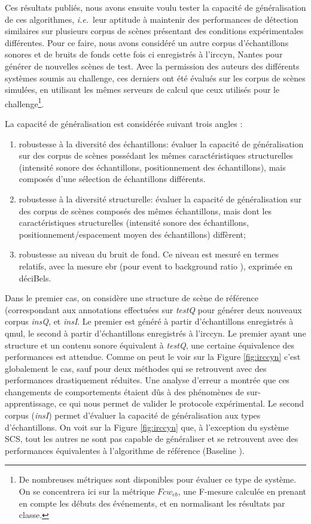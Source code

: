   Ces résultats publiés\cite{stowellhal-01253912}, nous avons ensuite voulu tester la capacité de généralisation de ces algorithmes, \textit{i.e.}~leur aptitude à maintenir des performances de détection similaires sur plusieurs corpus de scènes présentant des conditions expérimentales différentes. Pour ce faire, nous avons considéré un autre corpus d'échantillons sonores et de bruits de fonds  cette fois ci enregistrés à l'irccyn, Nantes pour générer de nouvelles scènes de test. Avec la permission des auteurs des différents systèmes soumis au challenge, ces derniers ont été évalués sur les corpus de scènes simulées, en utilisant les mêmes serveurs de calcul que ceux utilisés pour le challenge\footnote{De nombreuses métriques sont disponibles pour évaluer ce type de système. On se concentrera ici sur la métrique $Fcw_{eb}$, une F-mesure calculée en prenant en compte les débuts des événements, et en normalisant les résultats par classe.}.

  La capacité de généralisation est considérée suivant trois angles :
  \begin{enumerate}
    \item robustesse à la diversité des échantillons: évaluer la capacité de généralisation sur des corpus de scènes possédant les mêmes caractéristiques structurelles (intensité sonore des échantillons, positionnement des échantillons), mais composés d'une sélection de échantillons différents.
    \item robustesse à la diversité structurelle: évaluer la capacité de généralisation sur des corpus de scènes composés des mêmes échantillons, mais dont les caractéristiques structurelles (intensité sonore des échantillons, positionnement/espacement moyen des échantillons) diffèrent;
    \item robustesse au niveau du bruit de fond. Ce niveau est mesuré en termes relatifs, avec la mesure ebr (pour \og event to background ratio \fg), exprimée en déciBels.
  \end{enumerate}

  Dans le premier cas, on considère une structure de scène de référence (correspondant aux annotations effectuées sur \emph{testQ} pour générer deux nouveaux corpus \emph{insQ}, et \emph{insI}. Le premier est généré à partir d'échantillons enregistrés à qmul, le second à partir d'échantillons enregistrés à l'irccyn. Le premier ayant une structure et un contenu sonore équivalent à \emph{testQ}, une certaine équivalence des performances est attendue. Comme on peut le voir sur la Figure \ref{fig:irccyn} c'est globalement le cas, sauf pour deux méthodes qui se retrouvent avec des performances drastiquement réduites. Une analyse d'erreur a montrée que ces changements de comportements étaient dûs à des phénomènes de sur-apprentissage, ce qui nous permet de valider le protocole expérimental. Le second corpus (\emph{insI}) permet d'évaluer la capacité de généralisation aux types d'échantillons. On voit sur la Figure \ref{fig:irccyn} que, à l'exception du système SCS, tout les autres ne sont pas capable de généraliser et se retrouvent avec des performances équivalentes à l'algorithme de référence (\og Baseline \fg).

